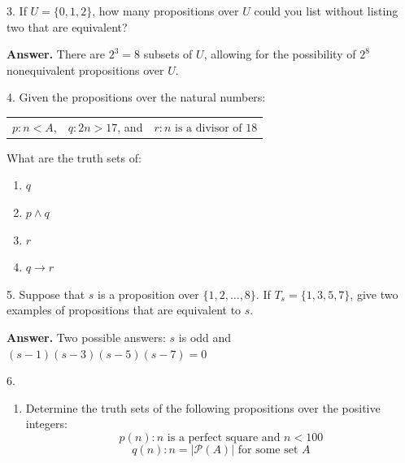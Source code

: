 \documentclass[10pt,]{book}
\theoremstyle{plain}
\theoremstyle{definition}
\theoremstyle{definition}
\theoremstyle{definition}
\theoremstyle{definition}
\begin{document}
\begin{exercisegroup}
%
\item[3.]\hypertarget{exercise-33}{}  If \(U = \{0, 1, 2\}\), how many propositions over \(U\) could you list without listing two that are equivalent?
%
\par\smallskip
\par\smallskip
\noindent\textbf{Answer.}\hypertarget{answer-16}{}\quad
 There are \(2^3=8\) subsets of \(U\), allowing for the possibility of \(2^8\) nonequivalent propositions over \(U\).%
\item[4.]\hypertarget{exercise-34}{}Given the propositions over the natural numbers:%
\leavevmode%
\begin{table}
\centering
\begin{tabular}{lll}
\(p : n < A\), &\(q : 2n > 17\), and &\(r : n \textrm{ is  a  divisor of } 18\)
\end{tabular}
\end{table}
\par
What are the truth sets of:%
\par
\leavevmode%
\begin{enumerate}[label=\alph*]
\item\hypertarget{li-257}{} \(q\)%
\item\hypertarget{li-258}{} \(p\land q\)%
\item\hypertarget{li-259}{} \(r\)%
\item\hypertarget{li-260}{} \(q\to r\)%
\end{enumerate}
%
\par\smallskip
\item[5.]\hypertarget{exercise-35}{} Suppose that \(s\) is a proposition over \(\{1, 2,\dots, 8\}\). If \(T_s = \{1, 3, 5, 7\}\), give two examples of propositions that are equivalent to \(s\).%
\par\smallskip
\par\smallskip
\noindent\textbf{Answer.}\hypertarget{answer-17}{}\quad
 Two possible answers: \(s\) is odd and \((s-1)(s-3)(s-5)(s-7)=0\)%
\item[6.]\hypertarget{exercise-36}{}\leavevmode%
\begin{enumerate}[label=\alph*]
\item\hypertarget{li-261}{}Determine the truth sets of the following propositions over the positive integers:
\begin{equation*}p(n) : n \textrm{ is a perfect square and }  n < 100\end{equation*} 
\begin{equation*}q(n) : n = \lvert \mathcal{P}(A) \rvert \textrm{ for some set } A\end{equation*}%

\end{enumerate}
\end{exercisegroup}
\end{document}
